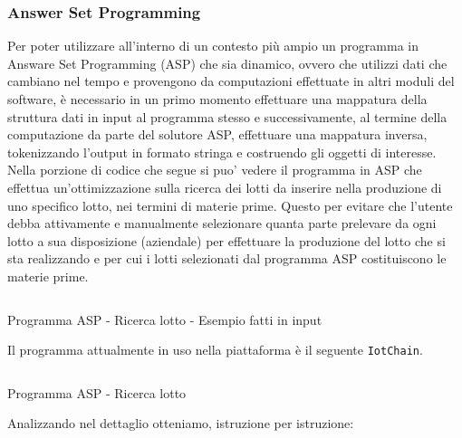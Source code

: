 \documentclass[a4paper,11pt]{article}
\newenvironment{longlisting}{\captionsetup{type=figure,labelformat=custom}}{}
\begin{document}
\subsubsection{Answer Set Programming}

Per poter utilizzare all'interno di un contesto più ampio un programma in Answare Set Programming (ASP) che sia dinamico, ovvero che utilizzi dati che cambiano nel tempo e provengono da computazioni effettuate in altri moduli del software, è necessario in un primo momento effettuare una mappatura della struttura dati in input al programma stesso e successivamente, al termine della computazione da parte del solutore ASP, effettuare una mappatura inversa, tokenizzando l'output in formato stringa e costruendo gli oggetti di interesse. Nella porzione di codice che segue si puo' vedere il programma in ASP che effettua un'ottimizzazione sulla ricerca dei lotti da inserire nella produzione di uno specifico lotto, nei termini di materie prime. Questo per evitare che l'utente debba attivamente e manualmente selezionare quanta parte prelevare da ogni lotto a sua disposizione (aziendale) per effettuare la produzione del lotto che si sta realizzando e per cui i lotti selezionati dal programma ASP costituiscono le materie prime.

\begin{longlisting}
  \inputminted{prolog}{./code/checkBatchInput.lp}
  \caption{Programma ASP - Ricerca lotto - Esempio fatti in input}
  \label{listing:asp1}
\end{longlisting}


Il programma attualmente in uso nella piattaforma è il seguente \texttt{IotChain}.

\begin{longlisting}
  \inputminted{prolog}{./code/checkBatch.lp}
  \caption{Programma ASP - Ricerca lotto}
  \label{listing:asp2}
\end{longlisting}

Analizzando nel dettaglio otteniamo, istruzione per istruzione:
\end{document}
